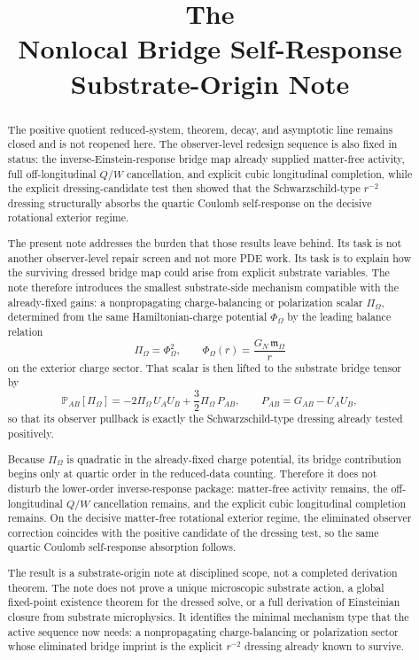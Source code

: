 \documentclass[11pt]{article}
\title{\textbf{The \TheoryName{}}\\[0.4em]
\large Nonlocal Bridge Self-Response Substrate-Origin Note}
\author{}
\date{}
\newcommand{\PolTen}{\mathbb P}
\newcommand{\ProjSub}{P}
\newcommand{\FlowPot}{\Phi_\Omega}
\newcommand{\BalanceField}{\Pi_\Omega}
\newcommand{\HamChargeOmega}{\mathfrak m_{\Omega}}
\begin{document}
\maketitle

\begin{abstract}
The positive quotient reduced-system, theorem, decay, and asymptotic line remains closed and is not reopened here. The observer-level redesign sequence is also fixed in status: the inverse-Einstein-response bridge map already supplied matter-free activity, full off-longitudinal \(Q/W\) cancellation, and explicit cubic longitudinal completion, while the explicit dressing-candidate test then showed that the Schwarzschild-type \(r^{-2}\) dressing structurally absorbs the quartic Coulomb self-response on the decisive rotational exterior regime.

The present note addresses the burden that those results leave behind. Its task is not another observer-level repair screen and not more PDE work. Its task is to explain how the surviving dressed bridge map could arise from explicit substrate variables. The note therefore introduces the smallest substrate-side mechanism compatible with the already-fixed gains: a nonpropagating charge-balancing or polarization scalar \(\BalanceField\), determined from the same Hamiltonian-charge potential \(\FlowPot\) by the leading balance relation
\[
\BalanceField=\FlowPot^2,
\qquad
\FlowPot(r)=\frac{G_N\,\HamChargeOmega}{r}
\]
on the exterior charge sector. That scalar is then lifted to the substrate bridge tensor by
\[
\PolTen_{AB}[\BalanceField]
=
-2\BalanceField\,U_AU_B
+\frac32\BalanceField\,\ProjSub_{AB},
\qquad
\ProjSub_{AB}=G_{AB}-U_AU_B,
\]
so that its observer pullback is exactly the Schwarzschild-type dressing already tested positively.

Because \(\BalanceField\) is quadratic in the already-fixed charge potential, its bridge contribution begins only at quartic order in the reduced-data counting. Therefore it does not disturb the lower-order inverse-response package: matter-free activity remains, the off-longitudinal \(Q/W\) cancellation remains, and the explicit cubic longitudinal completion remains. On the decisive matter-free rotational exterior regime, the eliminated observer correction coincides with the positive candidate of the dressing test, so the same quartic Coulomb self-response absorption follows.

The result is a substrate-origin note at disciplined scope, not a completed derivation theorem. The note does not prove a unique microscopic substrate action, a global fixed-point existence theorem for the dressed solve, or a full derivation of Einsteinian closure from substrate microphysics. It identifies the minimal mechanism type that the active sequence now needs: a nonpropagating charge-balancing or polarization sector whose eliminated bridge imprint is the explicit \(r^{-2}\) dressing already known to survive.
\end{abstract}
\end{document}
